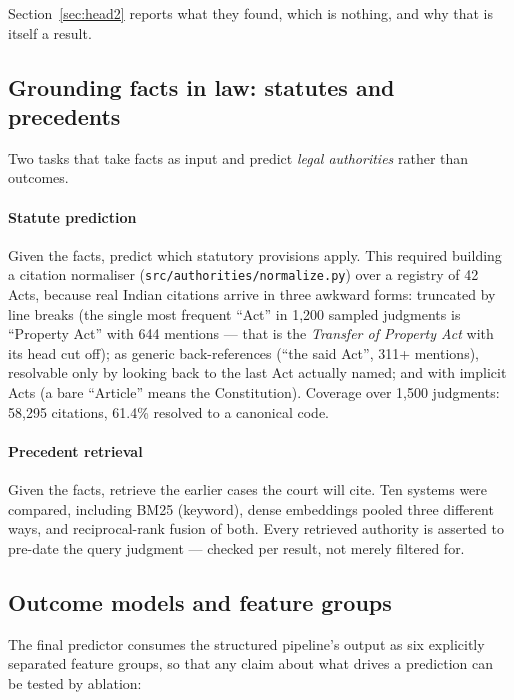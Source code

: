 \documentclass[12pt,a4paper]{article}
\newcommand{\code}[1]{\texttt{\small #1}}
\begin{document}
Section~\ref{sec:head2} reports what they found, which is nothing, and why that is itself a result.

\subsection{Grounding facts in law: statutes and precedents}

Two tasks that take facts as input and predict \emph{legal authorities} rather than outcomes.

\paragraph{Statute prediction} Given the facts, predict which statutory provisions apply.
This required building a citation normaliser (\code{src/authorities/normalize.py}) over a registry
of 42 Acts, because real Indian citations arrive in three awkward forms: truncated by line breaks
(the single most frequent ``Act'' in 1,200 sampled judgments is ``Property Act'' with 644 mentions
--- that is the \emph{Transfer of Property Act} with its head cut off); as generic back-references
(``the said Act'', 311+ mentions), resolvable only by looking back to the last Act actually named;
and with implicit Acts (a bare ``Article'' means the Constitution). Coverage over 1,500 judgments:
58,295 citations, 61.4\% resolved to a canonical code.

\paragraph{Precedent retrieval} Given the facts, retrieve the earlier cases the court will cite.
Ten systems were compared, including BM25 (keyword), dense embeddings pooled three different ways,
and reciprocal-rank fusion of both. Every retrieved authority is asserted to pre-date the query
judgment --- checked per result, not merely filtered for.

\subsection{Outcome models and feature groups}

The final predictor consumes the structured pipeline's output as six explicitly separated feature
groups, so that any claim about what drives a prediction can be tested by ablation:
\end{document}
